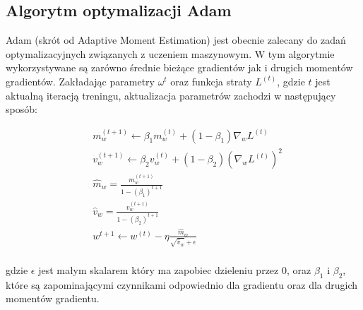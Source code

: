 \subsection{Algorytm optymalizacji Adam}
Adam (skrót od Adaptive Moment Estimation) jest obecnie zalecany do zadań optymalizacyjnych związanych z uczeniem maszynowym.
W tym algorytmie wykorzystywane są zarówno średnie bieżące gradientów jak i drugich momentów gradientów.
Zakładając parametry $\omega^{t}$ oraz funkcja straty $L^{(t)}$, gdzie $t$ jest aktualną iteracją treningu, 
aktualizacja parametrów zachodzi w następujący sposób:

\begin{align*}
  &m_w^{(t+1)} \leftarrow \beta_{1}m_w^{(t)} + (1 - \beta_1)\nabla_wL^{(t)} \\
  &v_w^{(t+1)} \leftarrow \beta_{2}v_w^{(t)} + (1 - \beta_2)(\nabla_wL^{(t)})^2 \\
  &\hat m_w = \frac{m_w^{(t+1)}}{1 - (\beta_1)^{t+1}} \\
  &\hat v_w = \frac{v_w^{(t+1)}}{1 - (\beta_2)^{t+1}} \\
  &w^{t+1} \leftarrow w^{(t)} -  \eta \frac{\hat m_w}{\sqrt{\hat v_w} + \epsilon} \\
\end{align*}

gdzie $\epsilon$ jest małym skalarem który ma zapobiec dzieleniu przez $0$, 
oraz $\beta _{1}$ i $\beta_{2}$, które są zapominającymi czynnikami odpowiednio dla gradientu oraz dla 
drugich momentów gradientu.
